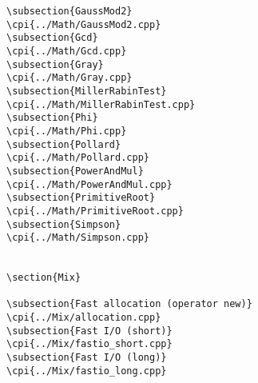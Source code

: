 {\begin{verbatim}
\subsection{GaussMod2}
\cpi{../Math/GaussMod2.cpp}
\subsection{Gcd}
\cpi{../Math/Gcd.cpp}
\subsection{Gray}
\cpi{../Math/Gray.cpp}
\subsection{MillerRabinTest}
\cpi{../Math/MillerRabinTest.cpp}
\subsection{Phi}
\cpi{../Math/Phi.cpp}
\subsection{Pollard}
\cpi{../Math/Pollard.cpp}
\subsection{PowerAndMul}
\cpi{../Math/PowerAndMul.cpp}
\subsection{PrimitiveRoot}
\cpi{../Math/PrimitiveRoot.cpp}
\subsection{Simpson}
\cpi{../Math/Simpson.cpp}


\section{Mix}

\subsection{Fast allocation (operator new)}
\cpi{../Mix/allocation.cpp}
\subsection{Fast I/O (short)}
\cpi{../Mix/fastio_short.cpp}
\subsection{Fast I/O (long)}
\cpi{../Mix/fastio_long.cpp}

\end{verbatim}}
